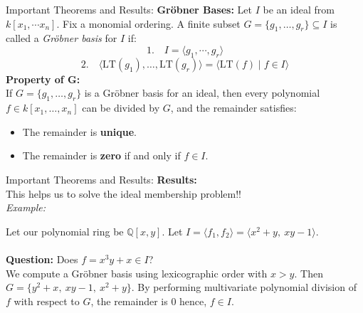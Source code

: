 \documentclass{beamer}
\begin{document}
\begin{frame}{Important Theorems and Results:} 
    \textbf{Gröbner Bases:}
        Let $I$ be an ideal from $k[x_1, \cdots x_n]$. Fix a monomial ordering. 
        A finite subset $G = \{g_1, \dots, g_r\} \subseteq I$ is called a \emph{Gröbner basis} for $I$ if:
        \[
        1. \quad I = \langle g_1, \cdots, g_r \rangle
        \]
        \[
        2. \quad \langle \text{LT}(g_1), \dots, \text{LT}(g_r) \rangle = \langle \text{LT}(f) \mid f \in I \rangle
        \]
    \textbf{Property of G:} \\
    If \( G = \{g_1, \dots, g_r\} \) is a Gröbner basis for an ideal,  then every polynomial \( f \in k[x_1, \dots, x_n] \) can be divided by \( G \), and the remainder satisfies:
    \begin{itemize}
    \item The remainder is \textbf{unique}.
    \item The remainder is \textbf{zero} if and only if \( f \in I \).
    \end{itemize}
\end{frame}

\begin{frame}{Important Theorems and Results:}
 \textbf{Results:} \\
    This helps us to solve the ideal membership problem!! \\
    \textit{Example:}
            
        Let our polynomial ring be \( \mathbb{Q}[x, y] \). Let $I =  \langle f_1, f_2 \rangle = \langle x^2 + y,\ xy - 1 \rangle$.\\
        
        \\ \textbf{Question:} Does $f = x^3y + x \in I$? \\
        
        We compute a Gröbner basis using lexicographic order with \( x > y \). Then $G = \{ y^2 + x,\  xy - 1, \ x^2 + y \}$. By performing multivariate polynomial division of $f$ with respect to $G$, the remainder is 0 hence, \( f \in I \). 
    
\end{frame}
\end{document}
